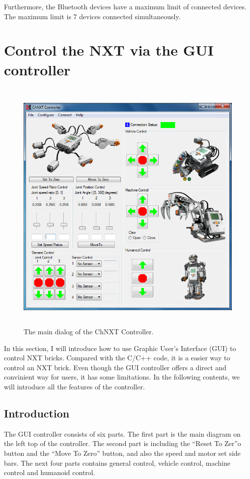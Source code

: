 \documentclass[11pt]{article}
\begin{document}
Furthermore, the Bluetooth devices have a maximum limit of connected devices. 
The maximum limit is 7 devices connected simultaneously.

\newpage
\section{Control the NXT via the GUI controller\label{sec:gui_controller}}
\begin{figure}[H]
  \begin{center}
    \includegraphics[height=5in]{figure/mindstorm/controlWithGUI.png}
    \caption{The main dialog of the ChNXT Controller.\label{fig:gui_control}}
  \end{center}
\end{figure}
In this section, I will introduce how to use Graphic User's Interface (GUI) to
control NXT bricks. Compared with the C/C++ code, it is a easier way to control
an NXT brick. Even though the GUI controller offers a direct and convinient way
for users, it has some limitations. In the following contents, we will introduce
all the features of the controller.

\subsection{Introduction \label{sec:gui_introduction}}
The GUI controller consists of six parts. The first part is the main diagram on
the left top of the controller. The second part is including the ``Reset To Zer''o
button and the ``Move To Zero'' button, and also the speed and motor set side bars.
The next four parts contains general control, vehicle control, machine control 
and humanoid control.
\end{document}
